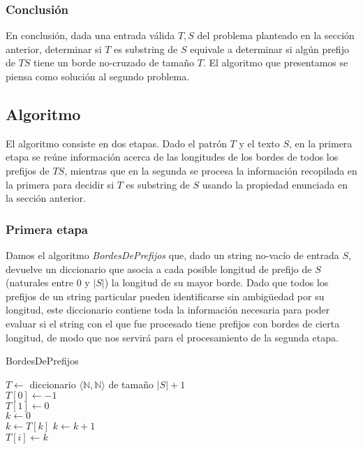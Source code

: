 \subsubsection{Conclusión}

En conclusión, dada una entrada válida $T, S$ del problema planteado en la sección anterior, determinar si $T$ es substring de $S$ equivale a determinar si algún prefijo de $TS$ tiene un borde no-cruzado de tamaño $T$. El algoritmo que presentamos se piensa como solución al segundo problema.

\subsection{Algoritmo}

El algoritmo consiste en dos etapas. Dado el patrón $T$ y el texto $S$, en la primera etapa se reúne información acerca de las longitudes de los bordes de todos los prefijos de $TS$, mientras que en la segunda se procesa la información recopilada en la primera para decidir si $T$ es substring de $S$ usando la propiedad enunciada en la sección anterior.

\subsubsection{Primera etapa}

Damos el algoritmo \textit{BordesDePrefijos} que, dado un string no-vacío de entrada $S$, devuelve un diccionario que asocia a cada posible longitud de prefijo de $S$ (naturales entre 0 y $|S|$) la longitud de su mayor borde. Dado que todos los prefijos de un string particular pueden identificarse sin ambigüedad por su longitud, este diccionario contiene toda la información necesaria para poder evaluar si el string con el que fue procesado tiene prefijos con bordes de cierta longitud, de modo que nos servirá para el procesamiento de la segunda etapa.

\bigskip

\begin{algorithm}[H]
	\caption{BordesDePrefijos}

	$T \gets$ diccionario $\langle \mathbb{N} , \mathbb{N} \rangle$ de tamaño $|S|+1$ \\
	$T [0] \gets -1$ \\
	$T [1] \gets 0$ \\
	$k \gets 0$ \\
	
     {
	 {
		$k \gets T[k]$
    	}
	$k \gets k+1$ \\
	$T[i] \gets k$
}

\end{algorithm}


